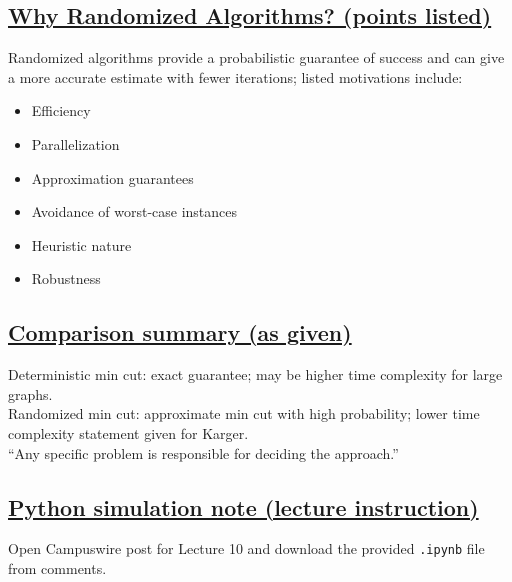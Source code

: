 \documentclass[11pt]{article}
\begin{document}
\subsection*{\underline{Why Randomized Algorithms? (points listed)}}
Randomized algorithms provide a probabilistic guarantee of success and can give a more accurate estimate with fewer iterations; listed motivations include:
\begin{itemize}
\item Efficiency
\item Parallelization
\item Approximation guarantees
\item Avoidance of worst-case instances
\item Heuristic nature
\item Robustness
\end{itemize}

\subsection*{\underline{Comparison summary (as given)}}
Deterministic min cut: exact guarantee; may be higher time complexity for large graphs.\\
Randomized min cut: approximate min cut with high probability; lower time complexity statement given for Karger.\\
``Any specific problem is responsible for deciding the approach.''

\subsection*{\underline{Python simulation note (lecture instruction)}}
Open Campuswire post for Lecture 10 and download the provided \texttt{.ipynb} file from comments.

\vspace{1cm}
\end{document}
